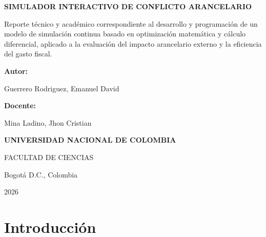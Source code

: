 \documentclass[12pt, a4paper]{article}
\begin{document}
\begin{titlepage}
    \centering
    \vspace*{1cm}
    
    {\LARGE\textbf{SIMULADOR INTERACTIVO DE CONFLICTO ARANCELARIO} \par}
    \vfill
    
    \begin{center}
        \begin{minipage}{0.75\textwidth}
            \centering
            {\large Reporte técnico y académico correspondiente al desarrollo y programación de un modelo de simulación continua basado en optimización matemática y cálculo diferencial, aplicado a la evaluación del impacto arancelario externo y la eficiencia del gasto fiscal.}
        \end{minipage}
    \end{center}
    \vfill
    
    {\large\textbf{Autor:} \par}
    {\large Guerrero Rodriguez, Emanuel David \par}
    \vfill
    
    {\large\textbf{Docente:} \par}
    {\large Mina Ladino, Jhon Cristian \par}
    \vfill
    
    {\large\textbf{UNIVERSIDAD NACIONAL DE COLOMBIA} \par}
    {\large FACULTAD DE CIENCIAS \par}
    \vspace{0.5cm}
    {\large Bogotá D.C., Colombia \par}
    {\large 2026 \par}
\end{titlepage}

\newpage
\setcounter{page}{1}

\tableofcontents
\newpage

\section{Introducción}
\end{document}
